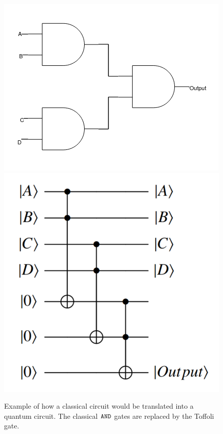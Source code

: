 \begin{figure}[h]
\begin{center}
\includegraphics[scale=0.5]{figures/Andgates.png}
\includegraphics[scale=0.2]{figures/Qcircuit.png}
\caption{Example of how a classical circuit would be translated into a quantum circuit. The classical ${\tt AND}$ gates are replaced by the Toffoli gate.}
\label{fig:circ}
\end{center}
\end{figure}


